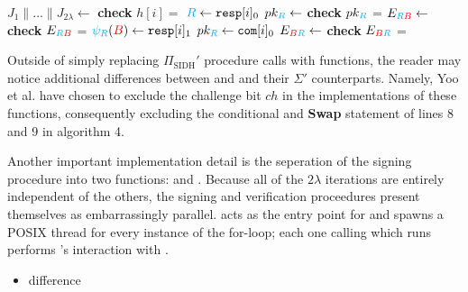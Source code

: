 \begin{algorithm}[H]
\caption{-- }\label{euclid}
\begin{algorithmic}[1]
\State $J_{1} \parallel ... \parallel J_{2\lambda} \gets$ 
	\State \textbf{check} $h[i] =$ 
		\State $\textcolor{cyan}{R} \gets \texttt{resp}[i]_{0}$
		\State $pk_{\textcolor{cyan}{R}} \gets$ 
		\State \textbf{check} $pk_{\textcolor{cyan}{R}}$ = 
		\State $E_{\textcolor{cyan}{R}\textcolor{red}{B}} \gets$ 
		\State \textbf{check} $E_{\textcolor{cyan}{R}\textcolor{red}{B}}$ = 
	\Else
		\State $\textcolor{cyan}{\psi_R}(\textcolor{red}{B}) \gets \texttt{resp}[i]_{1}$
		\State $pk_{\textcolor{cyan}{R}} \gets \texttt{com}[i]_{0}$
		\State $E_{\textcolor{red}{B}\textcolor{cyan}{R}} \gets$ 
		\State \textbf{check} $E_{\textcolor{red}{B}\textcolor{cyan}{R}}$ = 
	\EndIf
\EndFor

	\State {}
\Else
	\State {}
\EndIf
\end{algorithmic}
\end{algorithm}

Outside of simply replacing $\Pi_{\text{SIDH}}'$ procedure calls with \sidh functions, the reader may notice additional differences between  and  and their $\Sigma'$ counterparts. Namely, Yoo et al. have chosen to exclude the challenge bit $ch$ in the \sidh implementations of these functions, consequently excluding the conditional and \textbf{Swap} statement of lines 8 and 9 in algorithm 4. 

Another important implementation detail is the seperation of the signing procedure into two functions:  and . Because all of the $2\lambda$ iterations are entirely independent of the others, the signing and verification proceedures present themselves as embarrassingly parallel.  acts as the entry point for  and spawns a POSIX thread for every instance of the for-loop; each one calling  which runs performs \bob's interaction with \randall. 

\begin{itemize}
\item difference
\end{itemize}

